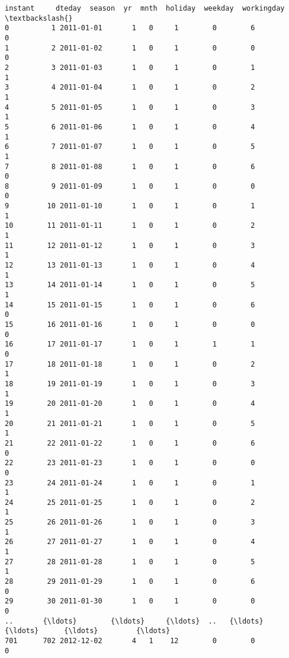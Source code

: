 \documentclass[11pt]{article}
\begin{document}
    \begin{Verbatim}[commandchars=\\\{\}]
     instant     dteday  season  yr  mnth  holiday  weekday  workingday  \textbackslash{}
0          1 2011-01-01       1   0     1        0        6           0   
1          2 2011-01-02       1   0     1        0        0           0   
2          3 2011-01-03       1   0     1        0        1           1   
3          4 2011-01-04       1   0     1        0        2           1   
4          5 2011-01-05       1   0     1        0        3           1   
5          6 2011-01-06       1   0     1        0        4           1   
6          7 2011-01-07       1   0     1        0        5           1   
7          8 2011-01-08       1   0     1        0        6           0   
8          9 2011-01-09       1   0     1        0        0           0   
9         10 2011-01-10       1   0     1        0        1           1   
10        11 2011-01-11       1   0     1        0        2           1   
11        12 2011-01-12       1   0     1        0        3           1   
12        13 2011-01-13       1   0     1        0        4           1   
13        14 2011-01-14       1   0     1        0        5           1   
14        15 2011-01-15       1   0     1        0        6           0   
15        16 2011-01-16       1   0     1        0        0           0   
16        17 2011-01-17       1   0     1        1        1           0   
17        18 2011-01-18       1   0     1        0        2           1   
18        19 2011-01-19       1   0     1        0        3           1   
19        20 2011-01-20       1   0     1        0        4           1   
20        21 2011-01-21       1   0     1        0        5           1   
21        22 2011-01-22       1   0     1        0        6           0   
22        23 2011-01-23       1   0     1        0        0           0   
23        24 2011-01-24       1   0     1        0        1           1   
24        25 2011-01-25       1   0     1        0        2           1   
25        26 2011-01-26       1   0     1        0        3           1   
26        27 2011-01-27       1   0     1        0        4           1   
27        28 2011-01-28       1   0     1        0        5           1   
28        29 2011-01-29       1   0     1        0        6           0   
29        30 2011-01-30       1   0     1        0        0           0   
..       {\ldots}        {\ldots}     {\ldots}  ..   {\ldots}      {\ldots}      {\ldots}         {\ldots}   
701      702 2012-12-02       4   1    12        0        0           0   

\end{Verbatim}
\end{document}
